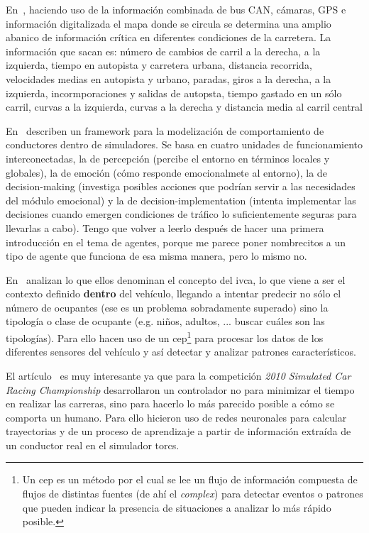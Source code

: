 En~\cite{satzoda2013towards}, haciendo uso de la información combinada de bus CAN, cámaras, GPS e información digitalizada el mapa donde se circula se determina una amplio abanico de información crítica en diferentes condiciones de la carretera. La información que sacan es: número de cambios de carril a la derecha, a la izquierda, tiempo en autopista y carretera urbana, distancia recorrida, velocidades medias en autopista y urbano, paradas, giros a la derecha, a la izquierda, incormporaciones y salidas de autopsta, tiempo gastado en un sólo carril, curvas a la izquierda, curvas a la derecha y distancia media al carril central

En~\cite{al2001framework} describen un framework para la modelización de comportamiento de conductores dentro de simuladores. Se basa en cuatro unidades de funcionamiento interconectadas, la de percepción (percibe el entorno en términos locales y globales), la de emoción (cómo responde emocionalmete al entorno), la de decision-making (investiga posibles acciones que podrían servir a las necesidades del módulo emocional) y la de decision-implementation (intenta implementar las decisiones cuando emergen condiciones de tráfico lo suficientemente seguras para llevarlas a cabo). Tengo que volver a leerlo después de hacer una primera introducción en el tema de agentes, porque me parece poner nombrecitos a un tipo de agente que funciona de esa misma manera, pero lo mismo no.

En~\cite{terroso2015complex} analizan lo que ellos denominan el concepto del \gls{ivca}, lo que viene a ser el contexto definido \textbf{dentro} del vehículo, llegando a intentar predecir no sólo el número de ocupantes (ese es un problema sobradamente superado) sino la tipología o clase de ocupante (e.g. niños, adultos, ... \TODO buscar cuáles son las tipologías). Para ello hacen uso de un \gls{cep}\footnote{Un \gls{cep} es un método por el cual se lee un flujo de información compuesta de flujos de distintas fuentes (de ahí el \textit{complex}) para detectar eventos o patrones que pueden indicar la presencia de situaciones a analizar lo más rápido posible.} para procesar los datos de los diferentes sensores del vehículo y así detectar y analizar patrones característicos.

El artículo~\cite{munoz2010human} es muy interesante ya que para la competición \textit{2010 Simulated Car Racing Championship} desarrollaron un controlador no para minimizar el tiempo en realizar las carreras, sino para hacerlo lo más parecido posible a cómo se comporta un humano. Para ello hicieron uso de redes neuronales para calcular trayectorias y de un proceso de aprendizaje a partir de información extraída de un conductor real en el simulador \gls{torcs}.

